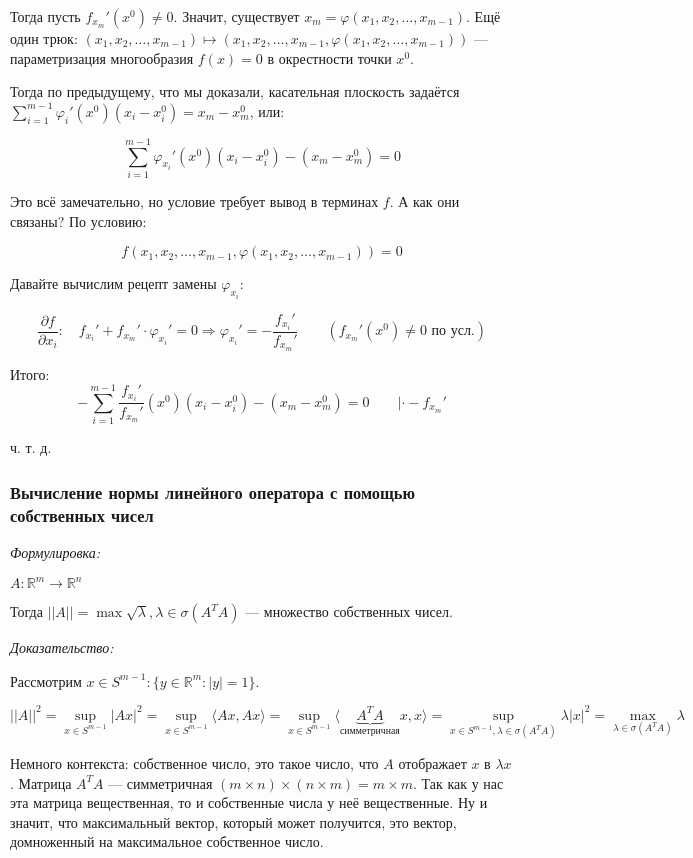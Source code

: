 \documentclass{article}
\begin{document}
Тогда пусть $f_{x_m}'(x^0) \neq 0$. Значит, существует $x_m = \varphi(x_1, x_2, \ldots, x_{m - 1})$. Ещё один трюк: $(x_1, x_2, \ldots, x_{m - 1}) \mapsto (x_1, x_2, \ldots, x_{m - 1}, \varphi(x_1, x_2, \ldots, x_{m - 1}))$ --- параметризация многообразия $f(x) = 0$ в окрестности точки $x^0$.

Тогда по предыдущему, что мы доказали, касательная плоскость задаётся $\sum_{i = 1}^{m - 1} \varphi_i'(x^0)(x_i - x^0_i) = x_m - x^0_m$, или:

\[\sum_{i = 1}^{m - 1} \varphi_{x_i}'(x^0)(x_i - x^0_i) - (x_m - x^0_m) = 0\]

Это всё замечательно, но условие требует вывод в терминах $f$. А как они связаны? По условию:

\[f(x_1, x_2, \ldots, x_{m - 1}, \varphi(x_1, x_2, \ldots, x_{m - 1})) = 0\]

Давайте вычислим рецепт замены $\varphi_{x_i}$:

\[\frac{\partial f}{\partial x_i}: \quad f_{x_i}' + f_{x_m}' \cdot \varphi_{x_i}' = 0 \Rightarrow \varphi_{x_i}' = - \frac{f_{x_i}'}{f_{x_m}'} \qquad \left(f_{x_m}'(x^0) \neq 0 \text{ по усл.}\right)\]

Итого:
\[-\sum_{i = 1}^{m - 1} \frac{f_{x_i}'}{f_{x_m}'}(x^0)(x_i - x^0_i) - (x_m - x^0_m) = 0 \qquad | \cdot -f_{x_m}'\]

ч. т. д.

\subsubsection{Вычисление нормы линейного оператора с помощью собственных чисел}
\textit{Формулировка:}

$A: \mathbb{R}^m \rightarrow \mathbb{R}^n$

Тогда $||A|| = \max {\sqrt{\lambda}}, \lambda \in \sigma(A^TA)$ --- множество собственных чисел. 

\textit{Доказательство:}

Рассмотрим $x \in S^{m - 1}: \{y \in \mathbb{R}^m: |y| = 1\}$.

\[||A||^2 = \sup_{x \in S^{m - 1}}|Ax|^2 = \sup_{x \in S^{m - 1}}\langle Ax, Ax \rangle = \sup_{x \in S^{m - 1}}\langle \underbrace{A^TA}_{\text{симметричная}}x, x \rangle = \sup_{x \in S^{m - 1}, \lambda \in \sigma(A^TA)} \lambda |x|^2 = \max_{\lambda \in \sigma(A^TA)} \lambda\]

Немного контекста: собственное число, это такое число, что $A$ отображает $x$ в $\lambda x$. Матрица $A^TA$ --- симметричная $(m \times n) \times (n \times m) = m \times m$. Так как у нас эта матрица вещественная, то и собственные числа у неё вещественные. Ну и значит, что максимальный вектор, который может получится, это вектор, домноженный на максимальное собственное число.
\end{document}
